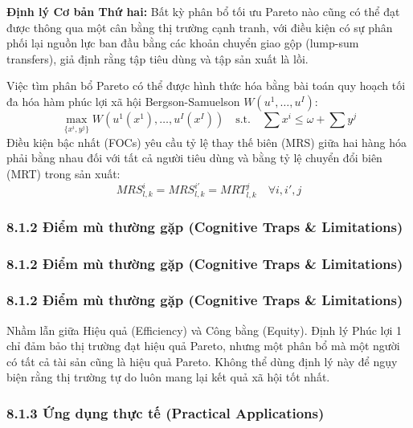 \documentclass[
]{article}
\begin{document}
\textbf{Định lý Cơ bản Thứ hai:} Bất kỳ phân bổ tối ưu Pareto nào cũng
có thể đạt được thông qua một cân bằng thị trường cạnh tranh, với điều
kiện có sự phân phối lại nguồn lực ban đầu bằng các khoản chuyển giao
gộp (lump-sum transfers), giả định rằng tập tiêu dùng và tập sản xuất là
lồi.

Việc tìm phân bổ Pareto có thể được hình thức hóa bằng bài toán quy
hoạch tối đa hóa hàm phúc lợi xã hội Bergson-Samuelson
\(W(u^1, \dots, u^I)\):
\[ \max_{\{x^i, y^j\}} W(u^1(x^1), \dots, u^I(x^I)) \quad \text{s.t.} \quad \sum x^i \leq \omega + \sum y^j \]
Điều kiện bậc nhất (FOCs) yêu cầu tỷ lệ thay thế biên (MRS) giữa hai
hàng hóa phải bằng nhau đối với tất cả người tiêu dùng và bằng tỷ lệ
chuyển đổi biên (MRT) trong sản xuất:
\[ MRS_{l,k}^i = MRS_{l,k}^{i'} = MRT_{l,k}^j \quad \forall i, i', j \]

\subsubsection{8.1.2 Điểm mù thường gặp (Cognitive Traps \&
Limitations)}\label{ux111iux1ec3m-muxf9-thux1b0ux1eddng-gux1eb7p-cognitive-traps-limitations-47}

\subsubsection{8.1.2 Điểm mù thường gặp (Cognitive Traps \&
Limitations)}\label{ux111iux1ec3m-muxf9-thux1b0ux1eddng-gux1eb7p-cognitive-traps-limitations-48}

\subsubsection{8.1.2 Điểm mù thường gặp (Cognitive Traps \&
Limitations)}\label{ux111iux1ec3m-muxf9-thux1b0ux1eddng-gux1eb7p-cognitive-traps-limitations-49}

Nhầm lẫn giữa Hiệu quả (Efficiency) và Công bằng (Equity). Định lý Phúc
lợi 1 chỉ đảm bảo thị trường đạt hiệu quả Pareto, nhưng một phân bổ mà
một người có tất cả tài sản cũng là hiệu quả Pareto. Không thể dùng định
lý này để ngụy biện rằng thị trường tự do luôn mang lại kết quả xã hội
tốt nhất.

\subsubsection{8.1.3 Ứng dụng thực tế (Practical
Applications)}\label{ux1ee9ng-dux1ee5ng-thux1ef1c-tux1ebf-practical-applications-25}
\end{document}
